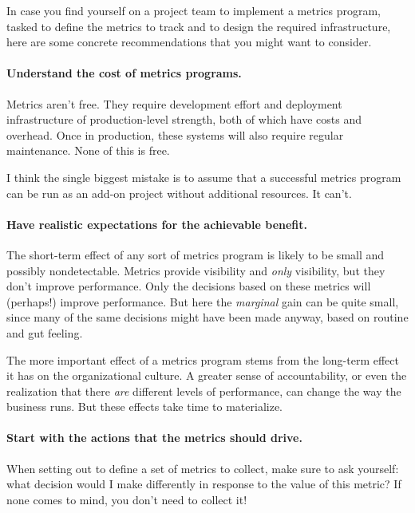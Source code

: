 In case you find yourself on a project team to implement a metrics
program, tasked to define the metrics to track and to design the
required infrastructure, here are some concrete recommendations that
you might want to consider.


\paragraph{Understand the cost of metrics programs.}
Metrics aren't free. They require development effort and deployment
infrastructure of production-level strength, both of which have costs
and overhead.  Once in production, these systems will also require
regular maintenance.  None of this is free.
	
I think the single biggest mistake is to assume that a successful
metrics program can be run as an add-on project without additional
resources.  It can't.

\paragraph{Have realistic expectations for the achievable benefit.}
The short-term effect of any sort of metrics program is likely to be
small and possibly nondetectable. Metrics provide visibility and
\emph{only} visibility, but they don't improve performance. Only the
decisions based on these metrics will (perhaps!) improve performance.
But here the \emph{marginal} gain can be quite small, since many of
the same decisions might have been made anyway, based on routine and
gut feeling.
	
The more important effect of a metrics program stems from the
long-term effect it has on the organizational culture. A greater sense
of accountability, or even the realization that there \emph{are}
different levels of performance, can change the way the business runs.
But these effects take time to materialize.

\paragraph{Start with the actions that the metrics should drive.}
When setting out to define a set of metrics to collect, make sure to
ask yourself: what decision would I make differently in response to
the value of this metric? If none comes to mind, you don't need to
collect it!

